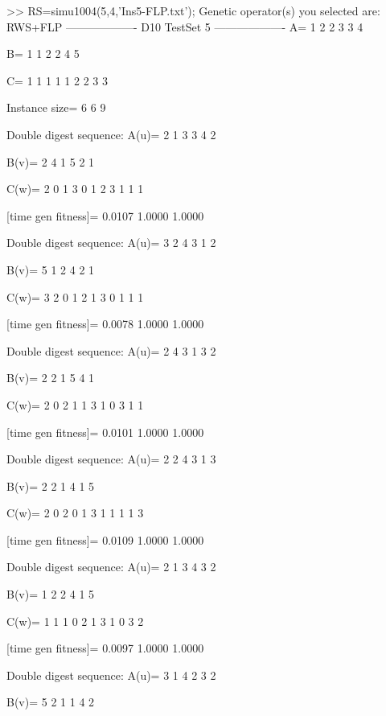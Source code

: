 >> RS=simu1004(5,4,'Ins5-FLP.txt');
Genetic operator(s) you selected are:
RWS+FLP
------------------- D10 TestSet 5 -------------------
A=
     1     2     2     3     3     4

B=
     1     1     2     2     4     5

C=
     1     1     1     1     1     2     2     3     3

Instance size=
     6     6     9

Double digest sequence:
A(u)=
     2     1     3     3     4     2

B(v)=
     2     4     1     5     2     1

C(w)=
     2     0     1     3     0     1     2     3     1     1     1

[time gen fitness]=
    0.0107    1.0000    1.0000

Double digest sequence:
A(u)=
     3     2     4     3     1     2

B(v)=
     5     1     2     4     2     1

C(w)=
     3     2     0     1     2     1     3     0     1     1     1

[time gen fitness]=
    0.0078    1.0000    1.0000

Double digest sequence:
A(u)=
     2     4     3     1     3     2

B(v)=
     2     2     1     5     4     1

C(w)=
     2     0     2     1     1     3     1     0     3     1     1

[time gen fitness]=
    0.0101    1.0000    1.0000

Double digest sequence:
A(u)=
     2     2     4     3     1     3

B(v)=
     2     2     1     4     1     5

C(w)=
     2     0     2     0     1     3     1     1     1     1     3

[time gen fitness]=
    0.0109    1.0000    1.0000

Double digest sequence:
A(u)=
     2     1     3     4     3     2

B(v)=
     1     2     2     4     1     5

C(w)=
     1     1     1     0     2     1     3     1     0     3     2

[time gen fitness]=
    0.0097    1.0000    1.0000

Double digest sequence:
A(u)=
     3     1     4     2     3     2

B(v)=
     5     2     1     1     4     2

